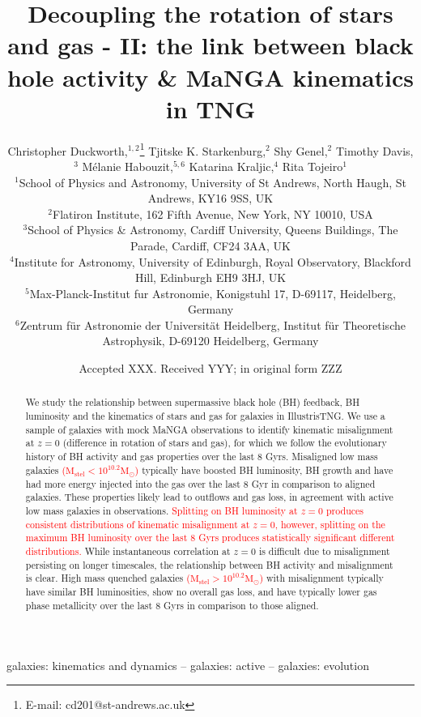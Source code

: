 \documentclass[fleqn,usenatbib]{mnras}
\title[Decoupling the rotation of stars and gas - II]{Decoupling the rotation of stars and gas - II: the link between black hole activity \& MaNGA kinematics in TNG}
\author[C. Duckworth et al.]
{Christopher Duckworth,$^{1,2}$\thanks{E-mail: cd201@st-andrews.ac.uk}
Tjitske K. Starkenburg,$^{2}$ 
Shy Genel,$^{2}$ 
Timothy Davis,$^{3}$ \newauthor
M\'elanie Habouzit,$^{5,6}$
Katarina Kraljic,$^{4}$
Rita Tojeiro$^{1}$ 
\\
$^{1}$School of Physics and Astronomy, University of St Andrews, North Haugh, St Andrews, KY16 9SS, UK\\
$^{2}$Flatiron Institute, 162 Fifth Avenue, New York, NY 10010, USA\\
$^{3}$School of Physics \& Astronomy, Cardiff University, Queens Buildings, The Parade, Cardiff, CF24 3AA, UK\\
$^{4}$Institute for Astronomy, University of Edinburgh, Royal Observatory, Blackford Hill, Edinburgh EH9 3HJ, UK\\
$^{5}$Max-Planck-Institut fur Astronomie, Konigstuhl 17, D-69117, Heidelberg, Germany\\
$^{6}$Zentrum f\"ur Astronomie der Universit\"at Heidelberg, Institut f\"ur Theoretische Astrophysik, D-69120 Heidelberg, Germany\\
}
\date{Accepted XXX. Received YYY; in original form ZZZ}
\newcommand{\red}[1]{{\textcolor{red}{#1}}}
\begin{document}
\label{firstpage}
\pagerange{\pageref{firstpage}--\pageref{lastpage}}
\maketitle

\begin{abstract}
We study the relationship between supermassive black hole (BH) feedback, BH luminosity and the kinematics of stars and gas for galaxies in IllustrisTNG. We use a sample of galaxies with mock MaNGA observations to identify kinematic misalignment at $z=0$ (difference in rotation of stars and gas), for which we follow the evolutionary history of BH activity and gas properties over the last 8 Gyrs. Misaligned low mass galaxies \red{($\mathrm{M_{stel} < 10^{10.2}M_{\odot}}$)} typically have boosted BH luminosity, BH growth and have had more energy injected into the gas over the last 8 Gyr in comparison to aligned galaxies. These properties likely lead to outflows and gas loss, in agreement with active low mass galaxies in observations. \red{Splitting on BH luminosity at $z=0$ produces consistent distributions of kinematic misalignment at $z=0$, however, splitting on the maximum BH luminosity over the last 8 Gyrs produces statistically significant different distributions.} While instantaneous correlation at $z=0$ is difficult due to misalignment persisting on longer timescales, the relationship between BH activity and misalignment is clear. High mass quenched galaxies \red{($\mathrm{M_{stel} > 10^{10.2}M_{\odot}}$)} with misalignment typically have similar BH luminosities, show no overall gas loss, and have typically lower gas phase metallicity over the last 8 Gyrs in comparison to those aligned.
\end{abstract}

\begin{keywords}
galaxies: kinematics and dynamics -- galaxies: active -- galaxies: evolution
\end{keywords}


\end{document}
